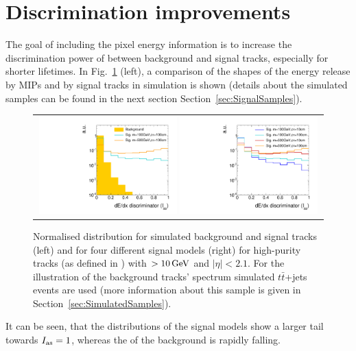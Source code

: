 \section{Discrimination improvements}
\label{sec:DiscriminationImprovements}
The goal of including the pixel energy information is to increase the discrimination power of \ias between background and signal tracks, especially for shorter lifetimes.
In Fig.~\ref{fig:MIPs-Signal-Dedx} (left), a comparison of the shapes of the energy release by MIPs and by signal tracks in simulation is shown (details about the simulated samples can be found in the next section Section~\ref{sec:SignalSamples}).
\begin{figure}[!b]
  \centering 
  \begin{tabular}{c}
    \includegraphics[width=0.49\textwidth]{figures/analysis/PixelCalibration/htrackASmiSmallRange_log_chiTracksGoodQualitySelection_2Signal_ttjets.pdf}   
    \includegraphics[width=0.49\textwidth]{figures/analysis/PixelCalibration/htrackASmiSmallRange_log_chiTracksGoodQualitySelection_4Signal.pdf}
  \end{tabular}
  \caption{Normalised \ias distribution for simulated background and signal tracks (left) and for four different signal models (right) 
           for high-purity tracks (as defined in \cite{bib:CMS:Tracking_2010}) with \pt$>10\,\text{Ge}\kern-0.06667em\text{V}$ and $|\eta|<2.1$.
           For the illustration of the background tracks' spectrum simulated $t\bar{t}$+jets events are used (more information about this sample is given in Section~\ref{sec:SimulatedSamples}).}
  \label{fig:MIPs-Signal-Dedx}
\end{figure} 
It can be seen, that the \ias distributions of the signal models show a larger tail towards $I_{\text{as}}=1$, whereas the \ias of the background is rapidly falling.

